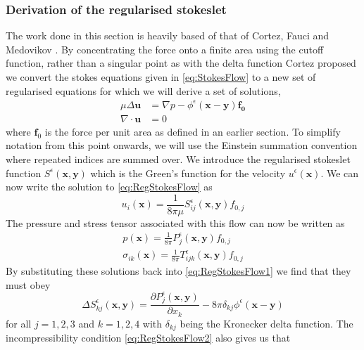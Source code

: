 \subsubsection{Derivation of the regularised stokeslet}
The work done in this section is heavily based of that of Cortez, Fauci and Medovikov \cite{Cortez2001,Cortez2005}. By concentrating the force onto a finite area using the cutoff function, rather than a singular point as with the delta function Cortez proposed we convert the stokes equations given in \cref{eq:StokesFlow} to a new set of regularised equations for which we will derive a set of solutions,
\begin{subequations}
\label{eq:RegStokesFlow}
\begin{align}
    \mu\Delta\boldsymbol{u} &= \nabla p - \phi^{\epsilon}(\bm{x}-\bm{y})\bm{f_0} \label{eq:RegStokesFlow1} \\
    \nabla \cdot \boldsymbol{u} &= 0 \label{eq:RegStokesFlow2}
\end{align}
\end{subequations}
where $\bm{f}_0$ is the force per unit area as defined in an earlier section.
To simplify notation from this point onwards, we will use the Einstein summation convention where repeated indices are summed over. We introduce the regularised stokeslet function $S^\epsilon(\bm{x},\bm{y})$ which is the Green's function for the velocity $u^\epsilon(\bm{x})$. We can now write the solution to \cref{eq:RegStokesFlow} as
\begin{equation}
\label{eq:regvelsol}
    u_i(\bm{x}) = \frac{1}{8\pi\mu}S^\epsilon_{ij}(\bm{x},\bm{y})f_{0,j}
\end{equation}
The pressure and stress tensor associated with this flow can now be written as
\begin{gather}
\label{eq:regpressuresol}
    p(\bm{x}) = \frac{1}{8\pi}P^\epsilon_{j}(\bm{x},\bm{y})f_{0,j}\\
\label{eq:regstresssol}
    \sigma_{ik}(\bm{x}) = \frac{1}{8\pi}T^\epsilon_{ijk}(\bm{x},\bm{y})f_{0,j}
\end{gather}
By substituting these solutions back into \cref{eq:RegStokesFlow1} we find that they must obey
\begin{equation}
\label{eq:regcondition1}
    \Delta S^\epsilon_{kj}(\bm{x},\bm{y}) = \frac{\partial P^\epsilon_{j}(\bm{x},\bm{y})}{\partial x_k} - 8\pi\delta_{kj}\phi^\epsilon(\bm{x}-\bm{y})
\end{equation}
for all $j=1,2,3$ and $k=1,2,4$ with $\delta_{kj}$ being the Kronecker delta function. The incompressibility condition \cref{eq:RegStokesFlow2} also gives us that
